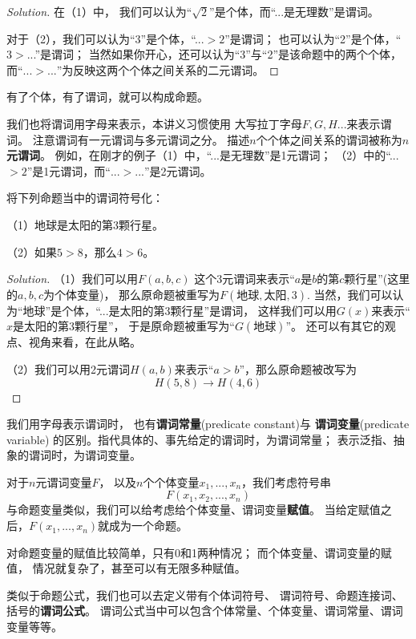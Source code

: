 \begin{proof}[Solution]在（1）中，
我们可以认为“$\sqrt{2}$”是个体，而“...是无理数”是谓词。

对于（2），我们可以认为“3”是个体，“...$>2$”是谓词；
也可以认为“2”是个体，“$3>$...”是谓词；
当然如果你开心，还可以认为“3”与“2”是该命题中的两个个体，
而“$...>...$”为反映这两个个体之间关系的二元谓词。
\end{proof}

有了个体，有了谓词，就可以构成命题。

我们也将谓词用字母来表示，本讲义习惯使用
大写拉丁字母$F,G,H...$来表示谓词。
注意谓词有一元谓词与多元谓词之分。
描述$n$个个体之间关系的谓词被称为\textbf{$n$元谓词}。
例如，在刚才的例子（1）中，“...是无理数”是1元谓词；
（2）中的“...$>2$”是1元谓词，而“$...>...$”是2元谓词。

\begin{example}将下列命题当中的谓词符号化：

（1）地球是太阳的第3颗行星。

（2）如果$5>8$，那么$4>6$。
\end{example}

\begin{proof}[Solution]（1）我们可以用$F(a,b,c)$
这个3元谓词来表示“$a$是$b$的第$c$颗行星”(这里的$a,b,c$为个体变量)，
那么原命题被重写为$F(\text{地球},\text{太阳},3)$.
当然，我们可以认为“地球”是个体，“...是太阳的第3颗行星”是谓词，
这样我们可以用$G(x)$来表示“$x$是太阳的第3颗行星”，
于是原命题被重写为“$G(\text{地球})$”。
还可以有其它的观点、视角来看，在此从略。

（2）我们可以用2元谓词$H(a,b)$来表示“$a>b$”，那么原命题被改写为
$$H(5,8)\rightarrow H(4,6)$$
\end{proof}

我们用字母表示谓词时，
也有\textbf{谓词常量}(predicate constant)与
\textbf{谓词变量}(predicate variable)
的区别。指代具体的、事先给定的谓词时，为谓词常量；
表示泛指、抽象的谓词时，为谓词变量。

对于$n$元谓词变量$F$，
以及$n$个个体变量$x_1,...,x_n$，我们考虑符号串
$$F(x_1,x_2,...,x_n)$$
与命题变量类似，我们可以给考虑给个体变量、谓词变量\textbf{赋值}。
当给定赋值之后，$F(x_1,...,x_n)$就成为一个命题。

对命题变量的赋值比较简单，只有0和1两种情况；
而个体变量、谓词变量的赋值，
情况就复杂了，甚至可以有无限多种赋值。

类似于命题公式，我们也可以去定义带有个体词符号、
谓词符号、命题连接词、括号的\textbf{谓词公式}。
谓词公式当中可以包含个体常量、个体变量、谓词常量、谓词变量等等。

